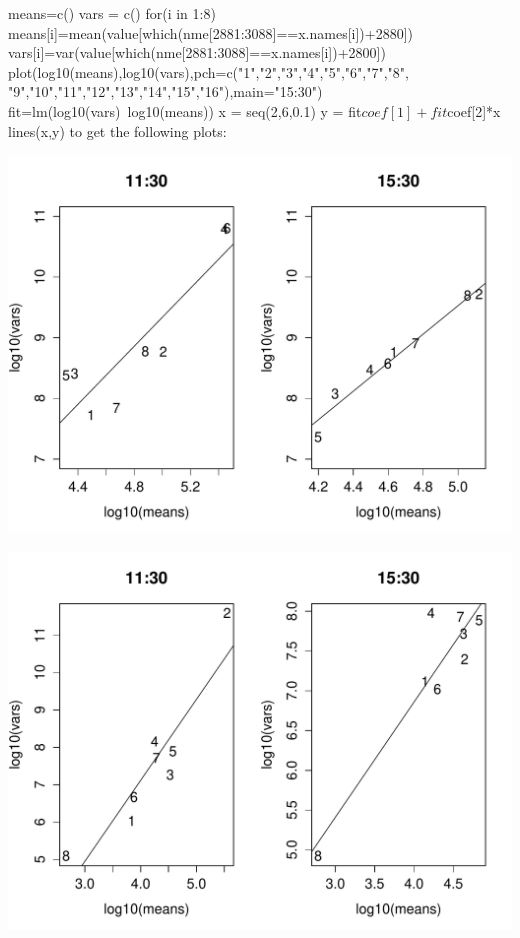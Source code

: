 \documentclass[letterpaper,10pt]{amsart}
\newenvironment{verbatimcode}{\bigskip \scriptsize \verbatim}{\endverbatim \normalsize \bigskip}
\begin{document}
\begin{enumerate}[{1}.1]
\begin{verbatimcode}
means=c()
vars = c()
for(i in 1:8)
{
  means[i]=mean(value[which(nme[2881:3088]==x.names[i])+2880])
  vars[i]=var(value[which(nme[2881:3088]==x.names[i])+2800])
}
plot(log10(means),log10(vars),pch=c("1","2","3","4","5","6","7","8",
                                    "9","10","11","12","13","14","15","16"),main="15:30")
fit=lm(log10(vars)~log10(means))
x = seq(2,6,0.1)
y = fit$coef[1] + fit$coef[2]*x
lines(x,y)
\end{verbatimcode}
to get the following plots:
\begin{center}
\includegraphics[scale=0.75]{tam_gregory_fig4_1router.pdf}
\end{center}
\begin{center}
\includegraphics[scale=0.75]{tam_gregory_fig4_2router.pdf}
\end{center}


\end{enumerate}
\end{document}
